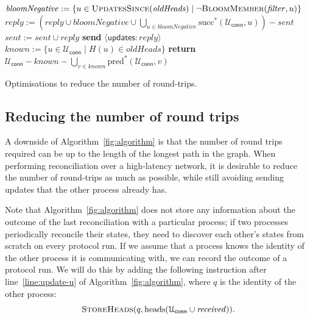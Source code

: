 \documentclass[a4paper,anonymous,USenglish]{lipics-v2019}
\begin{document}
\begin{algorithm}[t]
\begin{algorithmic}[1]
        \State $\mathit{bloomNegative} := \{u \in \Call{UpdatesSince}{\mathit{oldHeads}} \mid \neg\Call{BloomMember}{\mathit{filter}, u}\}$\label{line:bloom-member}
        \State $\mathit{reply} := \left(\mathit{reply} \cup \mathit{bloomNegative} \cup \bigcup_{u \in \mathit{bloomNegative}} \mathrm{succ}^*(\mathcal{U}_\mathsf{conn}, u)\right) - \mathit{sent}$\label{line:bloom-succ}
            \State $\mathit{sent} := \mathit{sent} \cup \mathit{reply}$
            \State \textbf{send} $\langle\mathsf{updates}: \mathit{reply}\rangle$ \label{line:a2-heads-reply}
        \EndIf
        \State {} \label{line:a2-heads-missing}
    \EndOn
    \State
        \State $\mathit{known} := \{u \in \mathcal{U}_\mathsf{conn} \mid H(u) \in \mathit{oldHeads}\}$
        \State \textbf{return} $\mathcal{U}_\mathsf{conn} - \mathit{known} - \bigcup_{v \in \mathit{known}} \mathrm{pred}^*(\mathcal{U}_\mathsf{conn}, v)$
    \EndFunction
    \end{algorithmic}
    \caption{Optimisations to reduce the number of round-trips.}\label{fig:algorithm2}
\end{algorithm}

\subsection{Reducing the number of round trips}\label{sec:reduce-round-trips}

A downside of Algorithm~\ref{fig:algorithm} is that the number of round trips required can be up to the length of the longest path in the graph.
When performing reconciliation over a high-latency network, it is desirable to reduce the number of round-trips as much as possible, while still avoiding sending updates that the other process already has.

Note that Algorithm~\ref{fig:algorithm} does not store any information about the outcome of the last reconciliation with a particular process; if two processes periodically reconcile their states, they need to discover each other's states from scratch on every protocol run.
If we assume that a process knows the identity of the other process it is communicating with, we can record the outcome of a protocol run.
We will do this by adding the following instruction after line~\ref{line:update-u} of Algorithm~\ref{fig:algorithm}, where $q$ is the identity of the other process:
\[ \textsc{StoreHeads}(q, \mathrm{heads}(\mathcal{U}_\mathsf{conn} \cup \mathit{received})). \]
\end{document}
